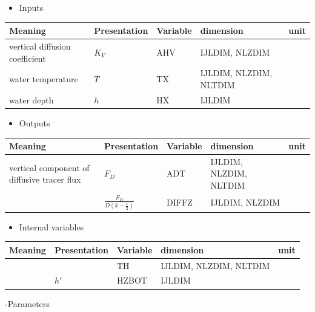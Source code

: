 \begin{itemize}
\tightlist
\item
  Inputs
\end{itemize}

\setlength\LTleft{0pt}\setlength\LTright{0pt}\begin{longtable}[]{@{}lllll@{}}
\toprule\relax
Meaning & Presentation & Variable & dimension & unit\tabularnewline
\midrule\relax
\endhead
vertical diffusion coefficient & \(K_V\) & AHV & IJLDIM, NLZDIM
&\tabularnewline
water temperature & \(T\) & TX & IJLDIM, NLZDIM, NLTDIM &\tabularnewline
water depth & \(h\) & HX & IJLDIM &\tabularnewline
\bottomrule
\end{longtable}

\begin{itemize}
\tightlist
\item
  Outputs
\end{itemize}

\setlength\LTleft{0pt}\setlength\LTright{0pt}\begin{longtable}[]{@{}lllll@{}}
\toprule\relax
Meaning & Presentation & Variable & dimension & unit\tabularnewline
\midrule\relax
\endhead
vertical component of diffusive tracer flux & \(F_D\) & ADT & IJLDIM,
NLZDIM, NLTDIM &\tabularnewline
& \(\frac{F_D}{D(k-\frac{1}{2})}\) & DIFFZ & IJLDIM, NLZDIM
&\tabularnewline
\bottomrule
\end{longtable}

\begin{itemize}
\tightlist
\item
  Internal variables
\end{itemize}

\setlength\LTleft{0pt}\setlength\LTright{0pt}\begin{longtable}[]{@{}lllll@{}}
\toprule\relax
Meaning & Presentation & Variable & dimension & unit\tabularnewline
\midrule\relax
\endhead
& & TH & IJLDIM, NLZDIM, NLTDIM &\tabularnewline
& \(h'\) & HZBOT & IJLDIM &\tabularnewline
\bottomrule
\end{longtable}

-Parameters

